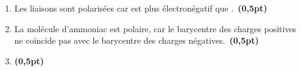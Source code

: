 \begin{enumerate}
    \item Les liaisons  sont polarisées car  est plus
          électronégatif que .~\textbf{(0,5pt)}
    \item La molécule d'ammoniac est polaire, car le barycentre des charges
          positives ne coïncide pas avec le barycentre des charges
          négatives.~\textbf{(0,5pt)}
    \item \mbox{}\par
          \begin{center}
          \end{center}
          \textbf{(0,5pt)}
\end{enumerate}
